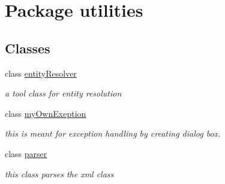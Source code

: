 \hypertarget{namespaceutilities}{}\section{Package utilities}
\label{namespaceutilities}
\subsection*{Classes}
\begin{DoxyCompactItemize}
\item 
class \hyperlink{classutilities_1_1entity_resolver}{entity\+Resolver}
\begin{DoxyCompactList}\small\item\em a tool class for entity resolution \end{DoxyCompactList}\item 
class \hyperlink{classutilities_1_1my_own_exeption}{my\+Own\+Exeption}
\begin{DoxyCompactList}\small\item\em this is meant for exception handling by creating dialog box. \end{DoxyCompactList}\item 
class \hyperlink{classutilities_1_1parser}{parser}
\begin{DoxyCompactList}\small\item\em this class parses the xml class \end{DoxyCompactList}\end{DoxyCompactItemize}
